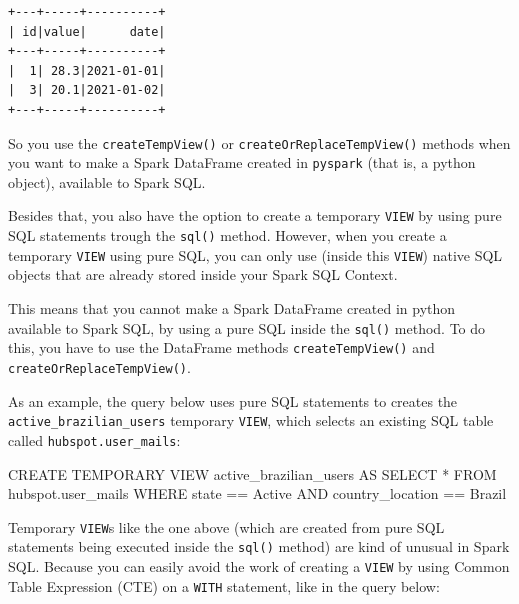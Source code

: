 \documentclass[
  11pt,
  letterpaper,
  DIV=11,
  numbers=noendperiod]{scrreprt}
\newenvironment{Shaded}{\begin{snugshade}}{\end{snugshade}}
\newcommand{\KeywordTok}[1]{\textcolor[rgb]{0.00,0.23,0.31}{#1}}
\newcommand{\NormalTok}[1]{\textcolor[rgb]{0.00,0.23,0.31}{#1}}
\newcommand{\OperatorTok}[1]{\textcolor[rgb]{0.37,0.37,0.37}{#1}}
\newcommand{\StringTok}[1]{\textcolor[rgb]{0.13,0.47,0.30}{#1}}
\begin{document}
\begin{verbatim}
+---+-----+----------+
| id|value|      date|
+---+-----+----------+
|  1| 28.3|2021-01-01|
|  3| 20.1|2021-01-02|
+---+-----+----------+
\end{verbatim}

So you use the \texttt{createTempView()} or
\texttt{createOrReplaceTempView()} methods when you want to make a Spark
DataFrame created in \texttt{pyspark} (that is, a python object),
available to Spark SQL.

Besides that, you also have the option to create a temporary
\texttt{VIEW} by using pure SQL statements trough the \texttt{sql()}
method. However, when you create a temporary \texttt{VIEW} using pure
SQL, you can only use (inside this \texttt{VIEW}) native SQL objects
that are already stored inside your Spark SQL Context.

This means that you cannot make a Spark DataFrame created in python
available to Spark SQL, by using a pure SQL inside the \texttt{sql()}
method. To do this, you have to use the DataFrame methods
\texttt{createTempView()} and \texttt{createOrReplaceTempView()}.

As an example, the query below uses pure SQL statements to creates the
\texttt{active\_brazilian\_users} temporary \texttt{VIEW}, which selects
an existing SQL table called \texttt{hubspot.user\_mails}:

\begin{Shaded}
\begin{Highlighting}[]
\KeywordTok{CREATE} \KeywordTok{TEMPORARY} \KeywordTok{VIEW}\NormalTok{ active\_brazilian\_users }\KeywordTok{AS}
\KeywordTok{SELECT} \OperatorTok{*}
\KeywordTok{FROM}\NormalTok{ hubspot.user\_mails}
\KeywordTok{WHERE}\NormalTok{ state }\OperatorTok{==} \StringTok{\textquotesingle{}Active\textquotesingle{}}
\KeywordTok{AND}\NormalTok{ country\_location }\OperatorTok{==} \StringTok{\textquotesingle{}Brazil\textquotesingle{}}
\end{Highlighting}
\end{Shaded}

Temporary \texttt{VIEW}s like the one above (which are created from pure
SQL statements being executed inside the \texttt{sql()} method) are kind
of unusual in Spark SQL. Because you can easily avoid the work of
creating a \texttt{VIEW} by using Common Table Expression (CTE) on a
\texttt{WITH} statement, like in the query below:
\end{document}
